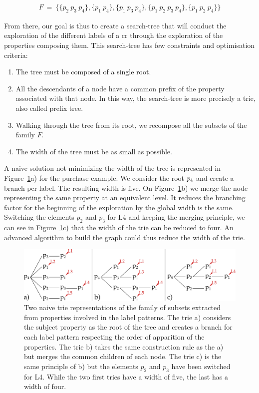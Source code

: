 \begin{align*}
 F\ =\ \{\{p_2\ p_3\ p_4\},
\{p_1\ p_4\},
\{p_1\ p_3\ p_4\},
\{p_1\ p_2\ p_3\ p_4\},
\{p_1\ p_2\ p_4\}\}
\end{align*}

From there, our goal is thus to create a search-tree that will conduct the exploration of the different labels of a \acrshort{cr} through the exploration of the properties composing them. This search-tree has few constraints and optimisation criteria:

\newpage

\begin{enumerate}
	\item The tree must be composed of a single root.
	\item All the descendants of a node have a common prefix of the property associated with that node. In this way, the search-tree is more precisely a trie, also called prefix tree.
	\item Walking through the tree from its root, we recompose all the subsets of the family $F$.
	\item The width of the tree must be as small as possible.
\end{enumerate}

A naive solution not minimizing the width of the tree is represented in Figure~\ref{fig:chap7_naive}a) for the purchase example. We consider the root $p_4$ and create a branch per label. The resulting width is five. On Figure~\ref{fig:chap7_naive}b) we merge the node representing the same property at an equivalent level. It reduces the branching factor for the beginning of the exploration by the global width is the same. Switching the elements $p_2$ and $p_3$ for L4 and keeping the merging principle, we can see in Figure~\ref{fig:chap7_naive}c) that the width of the trie can be reduced to four. An advanced algorithm to build the graph could thus reduce the width of the trie.

\begin{figure}[ht!]
\centering
\includegraphics[width=\textwidth]{figures/chapter7/naive.png}
\caption{\label{fig:chap7_naive} Two naive trie representations of the family of subsets extracted from properties involved in the label patterns. The trie a) considers the subject property as the root of the tree and creates a branch for each label pattern respecting the order of apparition of the properties. The trie b) takes the same construction rule as the a) but merges the common children of each node. The trie c) is the same principle of b) but the elements $p_2$ and $p_3$ have been switched for L4. While the two first tries have a width of five, the last has a width of four.}
\end{figure}

